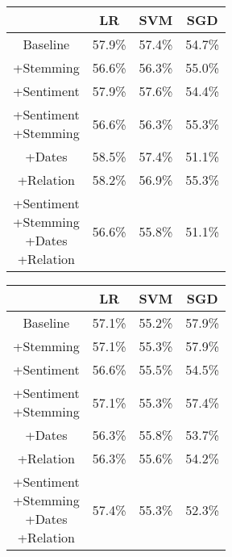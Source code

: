 \documentclass[11pt,a4paper]{article}
\begin{document}
\begin{center}
\begin{tabular}{ |c|c|c|c| }
 \hline
  & LR & SVM & SGD \\
  \hline
  Baseline & 57.9\% & 57.4\% & 54.7\% \\
  \hline
 +Stemming & 56.6\% & 56.3\% & 55.0\% \\
  \hline
 +Sentiment & 57.9\% & 57.6\% & 54.4\% \\
  \hline
  \shortstack{+Sentiment \\ +Stemming} & 56.6\% & 56.3\% & 55.3\%\\
 \hline
 +Dates & 58.5\% & 57.4\% & 51.1\% \\
  \hline
 +Relation & 58.2\% & 56.9\% & 55.3\% \\
  \hline
  \shortstack{+Sentiment \\ +Stemming \\+Dates \\+Relation} & 56.6\% & 55.8\% & 51.1\% \\
 \hline
\end{tabular}
\end{center}

\begin{center}
\begin{tabular}{ |c|c|c|c| }
 \hline
  & LR & SVM & SGD \\
  \hline
  Baseline & 57.1\% & 55.2\% & 57.9\% \\
  \hline
 +Stemming & 57.1\% & 55.3\% & 57.9\% \\
  \hline
 +Sentiment & 56.6\% & 55.5\% & 54.5\% \\
  \hline
  \shortstack{+Sentiment \\ +Stemming} & 57.1\% & 55.3\% & 57.4\%\\
 \hline
 +Dates & 56.3\% & 55.8\% & 53.7\% \\
  \hline
 +Relation & 56.3\% & 55.6\% & 54.2\% \\
  \hline
  \shortstack{+Sentiment \\ +Stemming \\+Dates \\+Relation} & 57.4\% & 55.3\% & 52.3\% \\
 \hline
\end{tabular}
\end{center}

\newpage
\end{document}
